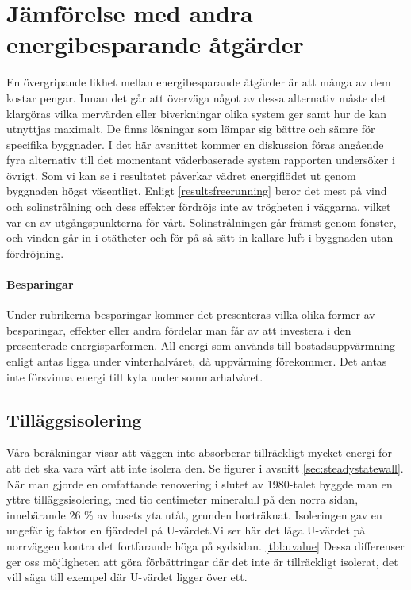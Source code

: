 \section{Jämförelse med andra energibesparande åtgärder}

En övergripande likhet mellan energibesparande åtgärder är att många av dem kostar pengar. Innan det går att överväga något av dessa alternativ måste det klargöras vilka mervärden eller biverkningar olika system ger samt hur de kan utnyttjas maximalt. De finns lösningar som lämpar sig bättre och sämre för specifika byggnader. I det här avsnittet kommer en diskussion föras angående fyra alternativ till det momentant väderbaserade system rapporten undersöker i övrigt.
Som vi kan se i resultatet påverkar vädret energiflödet ut genom byggnaden högst väsentligt. Enligt \ref{resultsfreerunning} beror det mest på vind och solinstrålning och dess effekter fördröjs inte av trögheten i väggarna, vilket var en av utgångspunkterna för vårt. Solinstrålningen går främst genom fönster, och vinden går in i otätheter och för på så sätt in kallare luft i byggnaden utan fördröjning.

\paragraph{Besparingar}
Under rubrikerna besparingar kommer det presenteras vilka olika former av besparingar, effekter eller andra fördelar man får av att investera i den presenterade energisparformen. All energi som används till bostadsuppvärmning enligt \cite{energideklaration} antas ligga under vinterhalvåret, då uppvärming förekommer. Det antas inte försvinna energi till kyla under sommarhalvåret.

\subsection{Tilläggsisolering}
Våra beräkningar visar att väggen inte absorberar tillräckligt mycket energi för att det ska vara värt att inte isolera den. Se figurer i avsnitt \ref{sec:steadystatewall}.
När man gjorde en omfattande renovering i slutet av 1980-talet byggde man en yttre tilläggsisolering, med tio centimeter mineralull på den norra sidan, \cite{arsredovisning} innebärande 26 \% av husets yta utåt, grunden borträknat. Isoleringen gav en ungefärlig faktor en fjärdedel på U-värdet.Vi ser här det låga U-värdet på norrväggen kontra det fortfarande höga på sydsidan. \ref{tbl:uvalue} Dessa differenser ger oss möjligheten att göra förbättringar där det inte är tillräckligt isolerat, det vill säga till exempel där U-värdet ligger över ett.

